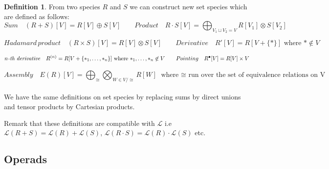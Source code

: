 \documentclass[a4paper]{article}
\theoremstyle{definition}
\newtheorem{definition}{Definition}
\begin{document}
\begin{definition}
From two species $R$ and $S$ we can construct new set species which are defined as follows:
$$Sum\quad (R+S)[V] = R[V]\oplus S[V]\qquad Product\quad R\cdot S[V] = \bigoplus_{V_1\sqcup V_2 = V} R[V_1]\otimes S[V_2]$$

$$Hadamard\, product \quad (R\times S)[V] = R[V]\otimes S[V]\qquad Derivative\quad R'[V] = R[V+\{\ast\}] \text{ where $\ast\not\in V$}$$ 

$$\text{\textit{$n$-th derivative}}\quad R^{(n)} = R[V+\{\ast_1,\dots,\ast_n\}] \text{ where $\ast_1,\dots,\ast_n\not \in V$}\qquad Pointing\quad R^{\bullet}[V] = R[V]\times V$$

$$Assembly\quad E(R)[V]= \bigoplus_{\cong}\bigotimes_{W\in V/\cong} R[W]\text{ where $\cong$ run over the set of equivalence relations on V}$$ 
\\We have the same definitions on set species by replacing sums by direct unions and
tensor products by Cartesian products.
\end{definition}

Remark that these definitions are compatible with $\mathcal{L}$ i.e $\mathcal{L}(R+S) =
\mathcal{L}(R)+\mathcal{L}(S)$, $\mathcal{L}(R\cdot S) = \mathcal{L}(R)\cdot \mathcal{L}(S)$ etc.




\subsection{Operads}
\end{document}
